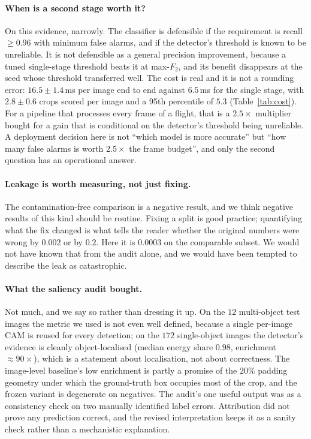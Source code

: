 \paragraph{When is a second stage worth it?} On this evidence, narrowly. The
classifier is defensible if the requirement is recall $\ge 0.96$ with minimum
false alarms, and if the detector's threshold is known to be unreliable. It is
not defensible as a general precision improvement, because a tuned single-stage
threshold beats it at max-$F_2$, and its benefit disappears at the seed whose
threshold transferred well. The cost is real and it is not a rounding error:
$16.5 \pm 1.4$\,ms per image end to end against $6.5$\,ms for the single stage,
with $2.8 \pm 0.6$ crops scored per image and a 95th percentile of $5.3$
(Table~\ref{tab:cost}). For a pipeline that processes every frame of a flight,
that is a $2.5\times$ multiplier bought for a gain that is conditional on the
detector's threshold being unreliable. A deployment decision here is not
``which model is more accurate'' but ``how many false alarms is worth $2.5\times$
the frame budget'', and only the second question has an operational answer.

\paragraph{Leakage is worth measuring, not just fixing.} The contamination-free
comparison is a negative result, and we think negative results of this kind
should be routine. Fixing a split is good practice; quantifying what the fix
changed is what tells the reader whether the original numbers were wrong by
$0.002$ or by $0.2$. Here it is $0.0003$ on the comparable subset. We would not
have known that from the audit alone, and we would have been tempted to describe
the leak as catastrophic.

\paragraph{What the saliency audit bought.} Not much, and we say so rather than
dressing it up. On the $12$ multi-object test images the metric we used is not
even well defined, because a single per-image CAM is reused for every detection;
on the $172$ single-object images the detector's evidence is cleanly
object-localised (median energy share $0.98$, enrichment $\approx90\times$), which
is a statement about localisation, not about correctness. The image-level
baseline's low enrichment is partly a promise of the $20\%$ padding geometry
under which the ground-truth box occupies most of the crop, and the frozen
variant is degenerate on negatives. The audit's one useful output was as a
consistency check on two manually identified label errors. Attribution did not
prove any prediction correct, and the revised interpretation keeps it as a sanity
check rather than a mechanistic explanation.
